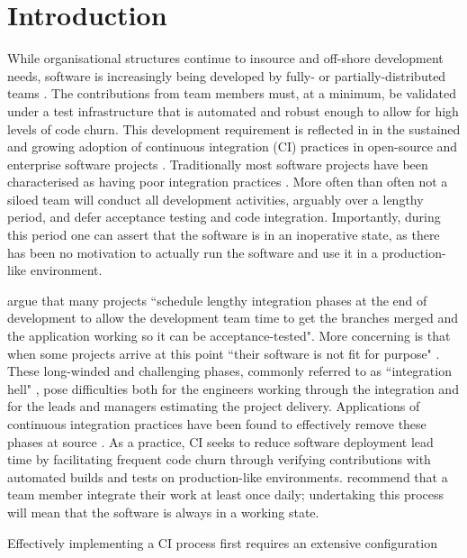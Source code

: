 \documentclass{report}
\begin{document}

\section{Introduction}
While organisational structures continue to insource and off-shore
development needs, software is increasingly being developed by fully- or 
partially-distributed teams \citep{Sharma}. The contributions from 
team members must, at a minimum, be validated
under a test infrastructure that is automated and robust enough to allow for
high levels of code churn. This development requirement is reflected in 
in the sustained and growing adoption of continuous integration (CI) 
practices in open-source and enterprise software projects \citep{Fitz, Vas}. 
Traditionally most software projects have been characterised as having
poor integration practices \citep{Duvall}. More often than often not a siloed team 
will conduct all development activities, arguably over a lengthy period,
and defer acceptance testing and code integration. Importantly, during
this period one can assert that the software is in an inoperative state, as there has
been no motivation to actually run the software and use it in a
production-like environment.
\par 
\citet{Jez} argue that many projects ``schedule lengthy integration phases at
the end of development to allow the development team time to get the branches
merged and the application working so it can be acceptance-tested". More concerning
is that when some projects arrive at this point ``their software is not fit for
purpose" \citep{Jez}. These long-winded and challenging phases, commonly referred
to as ``integration hell" \citet{Jez}, pose difficulties both for the engineers working through the integration
and for the leads and managers estimating the project delivery.
Applications of continuous integration practices have been found to effectively 
remove these phases at source \citep{Vas, Fitz, Jez, Duvall}. As a practice, CI seeks to reduce software deployment lead time by
facilitating frequent code churn through verifying contributions with automated 
builds and tests on production-like environments. \citet{Jez} recommend
that a team member integrate their work at least once daily;
undertaking this process will mean that the software is always in a working state. 
\par
Effectively implementing a CI process first requires an extensive configuration
\end{document}
